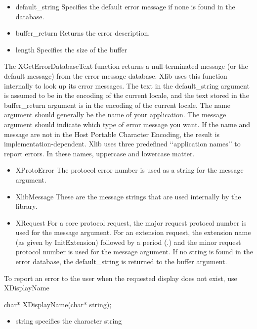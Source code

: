 \documentclass{report}
\begin{document}
\begin{itemize}
\begin{itemize}
                \item default\_string Specifies the default error message if none is found in the database.
                \item buffer\_return Returns the error description.
                \item length Specifies the size of the buffer
            \end{itemize}
            The XGetErrorDatabaseText function returns a null-terminated message (or the default message) from the error message database. Xlib uses this function internally to look up its error messages. The text in the default\_string argument is assumed to be in the encoding of the current locale, and the text stored in the buffer\_return argument is in the encoding of the current locale.
            \bigbreak \noindent 
            The name argument should generally be the name of your application. The message argument should indicate which type of error message you want. If the name and message are not in the Host Portable Character Encoding, the result is implementation-dependent. Xlib uses three predefined ‘‘application names’’ to report errors. In these names, uppercase and lowercase matter.
            \begin{itemize}
                \item XProtoError The protocol error number is used as a string for the message argument.
                \item XlibMessage These are the message strings that are used internally by the library.
                \item XRequest For a core protocol request, the major request protocol number is used for the message argument. For an extension request, the extension name (as given by InitExtension) followed by a period (.) and the minor request protocol number is used for the message argument. If no string is found in the error database, the default\_string is returned to the buffer argument.
            \end{itemize}
            To report an error to the user when the requested display does not exist, use XDisplayName
            \bigbreak \noindent 
            \begin{cppcode}
            char* XDisplayName(char* string);
            \end{cppcode}
            \bigbreak \noindent
            \begin{itemize}
                \item string specifies the character string

\end{itemize}
\end{itemize}
\end{document}
